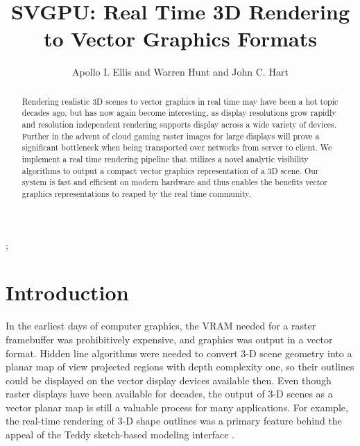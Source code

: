 \documentclass[review]{acmsiggraph}
\title{SVGPU: Real Time 3D Rendering to Vector Graphics Formats}
\author{Apollo I. Ellis and Warren Hunt and John C. Hart}
\begin{document}

 \teaser{
 }

\maketitle

\begin{abstract}

Rendering realistic 3D scenes to vector graphics in real time may have been a
hot topic decades ago, but has now again become interesting, as display
resolutions grow rapidly and resolution independent rendering supports display
across a wide variety of devices. Further in the advent of cloud gaming raster
images for large displays will prove a significant bottleneck when being
transported over networks from server to client. We implement a real time
rendering pipeline that utilizes a novel analytic visibility algorithms to
output a compact vector graphics representation of a 3D scene. Our system is
fast and efficient on modern hardware and thus enables the benefits vector
graphics representations to reaped by the real time community.

\end{abstract}

\begin{CRcatlist}
  ;
\end{CRcatlist}

\keywordlist


\copyrightspace

\section{Introduction}
In the earliest days of computer graphics, the VRAM needed for a raster
framebuffer was prohibitively expensive, and graphics was output in a vector
format. Hidden line algorithms were needed to convert 3-D scene geometry into
a planar map of view projected regions with depth complexity one, so their
outlines could be displayed on the vector display devices available then. Even
though raster displays have been available for decades, the output of 3-D
scenes as a vector planar map is still a valuable process for many
applications. For example, the real-time rendering of 3-D shape outlines was a
primary feature behind the appeal of the Teddy sketch-based modeling interface
\cite{igarashi1999}.
\end{document}

